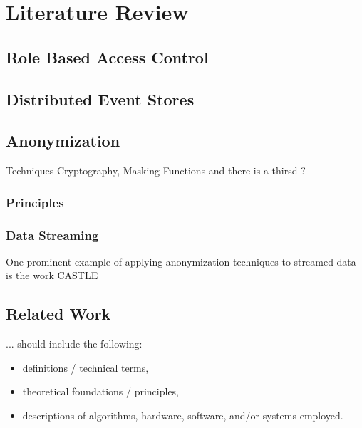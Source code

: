 \chapter{Literature Review\label{cha:chapter2}}

\section{Role Based Access Control}

\section{Distributed Event Stores}

\section{Anonymization\label{sec:anon}}
Techniques 
Cryptography, Masking Functions and there is a thirsd ?

\subsection{Principles}

\subsection{Data Streaming}
One prominent example of applying anonymization techniques to streamed data is the work CASTLE \cite{Cao2008}

\section{Related Work}

... should include the following:
\begin{itemize}
    \item definitions / technical terms,
    \item theoretical foundations / principles,
    \item descriptions of algorithms, hardware, software, and/or systems employed.
\end{itemize}



